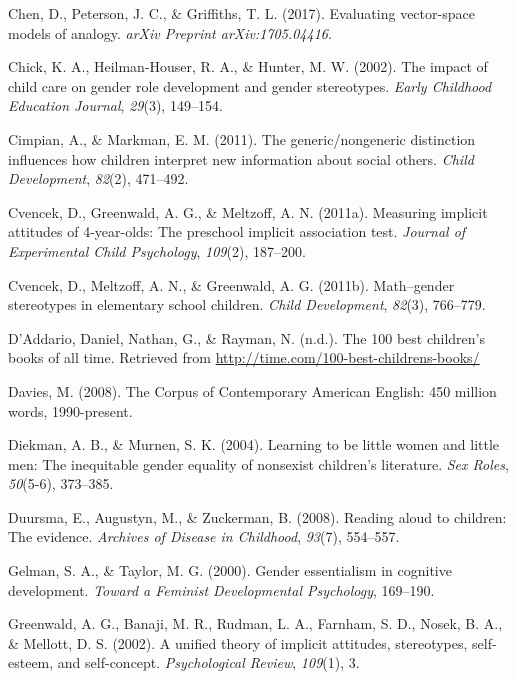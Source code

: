 \documentclass[english,,man,floatsintext]{apa6}
\begin{document}
\leavevmode\hypertarget{ref-chen2017evaluating}{}%
Chen, D., Peterson, J. C., \& Griffiths, T. L. (2017). Evaluating vector-space models of analogy. \emph{arXiv Preprint arXiv:1705.04416}.

\leavevmode\hypertarget{ref-chick2002impact}{}%
Chick, K. A., Heilman-Houser, R. A., \& Hunter, M. W. (2002). The impact of child care on gender role development and gender stereotypes. \emph{Early Childhood Education Journal}, \emph{29}(3), 149--154.

\leavevmode\hypertarget{ref-cimpian2011generic}{}%
Cimpian, A., \& Markman, E. M. (2011). The generic/nongeneric distinction influences how children interpret new information about social others. \emph{Child Development}, \emph{82}(2), 471--492.

\leavevmode\hypertarget{ref-cvencek2011measuring}{}%
Cvencek, D., Greenwald, A. G., \& Meltzoff, A. N. (2011a). Measuring implicit attitudes of 4-year-olds: The preschool implicit association test. \emph{Journal of Experimental Child Psychology}, \emph{109}(2), 187--200.

\leavevmode\hypertarget{ref-cvencek2011math}{}%
Cvencek, D., Meltzoff, A. N., \& Greenwald, A. G. (2011b). Math--gender stereotypes in elementary school children. \emph{Child Development}, \emph{82}(3), 766--779.

\leavevmode\hypertarget{ref-time_100_kidbooks}{}%
D'Addario, Daniel, Nathan, G., \& Rayman, N. (n.d.). The 100 best children's books of all time. Retrieved from \url{http://time.com/100-best-childrens-books/}

\leavevmode\hypertarget{ref-davies2008corpus}{}%
Davies, M. (2008). The Corpus of Contemporary American English: 450 million words, 1990-present.

\leavevmode\hypertarget{ref-diekman2004learning}{}%
Diekman, A. B., \& Murnen, S. K. (2004). Learning to be little women and little men: The inequitable gender equality of nonsexist children's literature. \emph{Sex Roles}, \emph{50}(5-6), 373--385.

\leavevmode\hypertarget{ref-duursma2008reading}{}%
Duursma, E., Augustyn, M., \& Zuckerman, B. (2008). Reading aloud to children: The evidence. \emph{Archives of Disease in Childhood}, \emph{93}(7), 554--557.

\leavevmode\hypertarget{ref-gelman2000gender}{}%
Gelman, S. A., \& Taylor, M. G. (2000). Gender essentialism in cognitive development. \emph{Toward a Feminist Developmental Psychology}, 169--190.

\leavevmode\hypertarget{ref-greenwald2002unified}{}%
Greenwald, A. G., Banaji, M. R., Rudman, L. A., Farnham, S. D., Nosek, B. A., \& Mellott, D. S. (2002). A unified theory of implicit attitudes, stereotypes, self-esteem, and self-concept. \emph{Psychological Review}, \emph{109}(1), 3.
\end{document}
